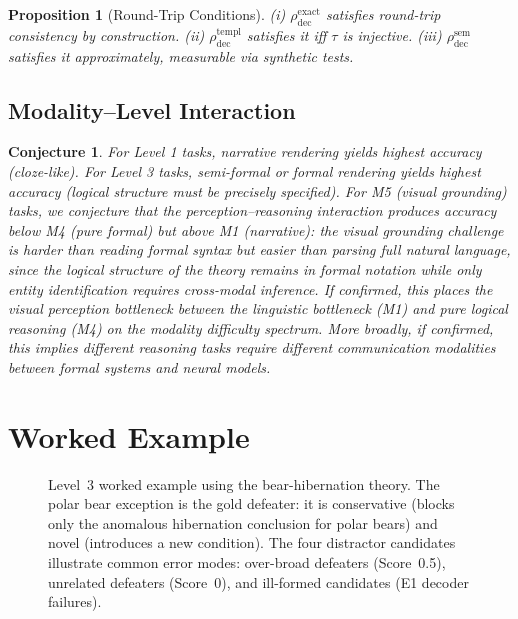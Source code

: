 \documentclass{article}
\newtheorem{proposition}[theorem]{Proposition}
\newtheorem{conjecture}[theorem]{Conjecture}
\theoremstyle{definition}
\begin{document}
\begin{proposition}[Round-Trip Conditions]\label{prop:roundtrip}
(i) $\rho_{\mathrm{dec}}^{\mathrm{exact}}$ satisfies round-trip consistency by construction. (ii) $\rho_{\mathrm{dec}}^{\mathrm{templ}}$ satisfies it iff $\tau$ is injective. (iii) $\rho_{\mathrm{dec}}^{\mathrm{sem}}$ satisfies it approximately, measurable via synthetic tests.
\end{proposition}

\subsection{Modality--Level Interaction}

\begin{conjecture}\label{conj:modlevel}
For Level 1 tasks, narrative rendering yields highest accuracy (cloze-like). For Level 3 tasks, semi-formal or formal rendering yields highest accuracy (logical structure must be precisely specified). For M5 (visual grounding) tasks, we conjecture that the perception--reasoning interaction produces accuracy below M4 (pure formal) but above M1 (narrative): the visual grounding challenge is harder than reading formal syntax but easier than parsing full natural language, since the logical structure of the theory remains in formal notation while only entity identification requires cross-modal inference. If confirmed, this places the visual perception bottleneck between the linguistic bottleneck (M1) and pure logical reasoning (M4) on the modality difficulty spectrum. More broadly, if confirmed, this implies different reasoning tasks require different communication modalities between formal systems and neural models.
\end{conjecture}


\section{Worked Example}\label{app:example}

\begin{figure}[h]
\centering
\resizebox{0.9\textwidth}{!}{}
\caption{Level~3 worked example using the bear-hibernation theory. The polar bear exception is the gold defeater: it is conservative (blocks only the anomalous hibernation conclusion for polar bears) and novel (introduces a new condition). The four distractor candidates illustrate common error modes: over-broad defeaters (Score~0.5), unrelated defeaters (Score~0), and ill-formed candidates (E1 decoder failures).}
\label{fig:l3_example}
\end{figure}
\end{document}
